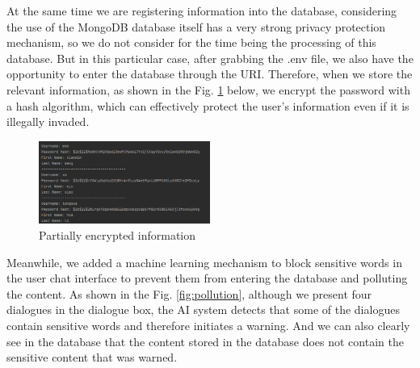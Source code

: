 \documentclass{article}
\begin{document}
At the same time we are registering information into the database, considering the use of the MongoDB database itself has a very strong privacy protection mechanism, so we do not consider for the time being the processing of this database. 
But in this particular case, after grabbing the .env file, we also have the opportunity to enter the database through the URI. 
Therefore, when we store the relevant information, as shown in the Fig. \ref{fig:hash} below, we encrypt the password with a hash algorithm, which can effectively protect the user's information even if it is illegally invaded.

\begin{figure}[htb]
    \centering
    \includegraphics[width=0.5\textwidth]{images/Partially_encrypted_information.png}
    \caption{Partially encrypted information}
    \label{fig:hash}
\end{figure}

Meanwhile, we added a machine learning mechanism to block sensitive words in the user chat interface to prevent them from entering the database and polluting the content. 
As shown in the Fig. \ref{fig:pollution}, although we present four dialogues in the dialogue box, the AI system detects that some of the dialogues contain sensitive words and therefore initiates a warning. 
And we can also clearly see in the database that the content stored in the database does not contain the sensitive content that was warned.
\end{document}
